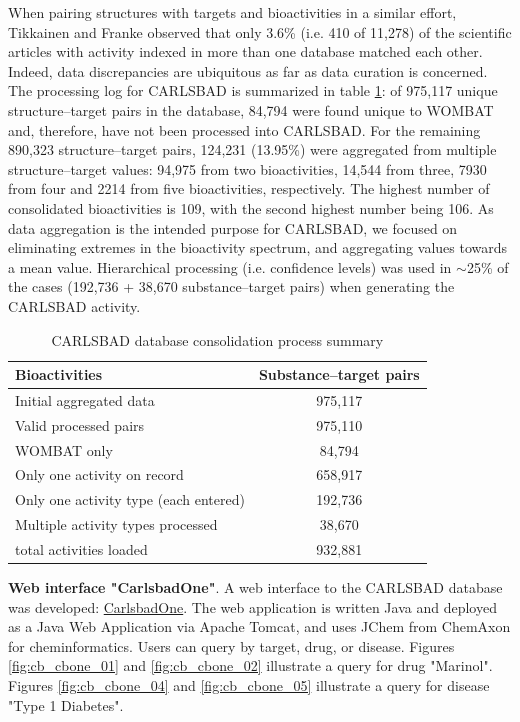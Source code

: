 When pairing structures with targets and bioactivities in a similar effort, Tikkainen and Franke observed that only 3.6\% (i.e. 410 of 11,278) of the scientific articles with activity indexed in more than one database matched each other. Indeed, data discrepancies are ubiquitous as far as data curation is concerned\cite{Tiikkainen2012-cw}. The processing log for CARLSBAD is summarized in table \ref{tab:cb_01}: of 975,117 unique structure–target pairs in the database, 84,794 were found unique to WOMBAT and, therefore, have not been processed into CARLSBAD. For the remaining 890,323 structure–target pairs, 124,231 (13.95\%) were aggregated from multiple structure–target values: 94,975 from two bioactivities, 14,544 from three, 7930 from four and 2214 from five bioactivities, respectively. The highest number of consolidated bioactivities is 109, with the second highest number being 106. As data aggregation is the intended purpose for CARLSBAD, we focused on eliminating extremes in the bioactivity spectrum, and aggregating values towards a mean value. Hierarchical processing (i.e. confidence levels) was used in $\sim$25\% of the cases (192,736 + 38,670 substance–target pairs) when generating the CARLSBAD activity.

\begin{table}
\caption{CARLSBAD database consolidation process summary}
\label{tab:cb_01}
\centering
\begin{tabular}{l|c}
\hline
\textbf{Bioactivities} & \textbf{Substance–target pairs}\\
\hline
Initial aggregated data & 975,117\\
Valid processed pairs & 975,110\\
WOMBAT only & 84,794\\
Only one activity on record & 658,917\\
Only one activity type (each entered) & 192,736\\ 
Multiple activity types processed & 38,670\\
total activities loaded & 932,881\\
\hline
\end{tabular}
\end{table}


\textbf{Web interface "CarlsbadOne"}. A web interface to the CARLSBAD database was developed:  \href{https://datascience.unm.edu/tomcat/carlsbad/carlsbadone}{CarlsbadOne}. The web application is written Java and deployed as a Java Web Application via Apache Tomcat, and uses JChem from ChemAxon for cheminformatics. Users can query by target, drug, or disease. Figures \ref{fig:cb_cbone_01} and \ref{fig:cb_cbone_02} illustrate a query for drug "Marinol". Figures \ref{fig:cb_cbone_04} and \ref{fig:cb_cbone_05} illustrate a query for disease "Type 1 Diabetes".

